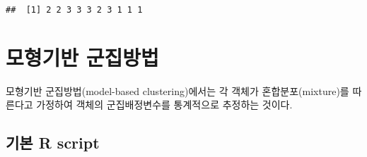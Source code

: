 \documentclass[]{book}
\newenvironment{Shaded}{\begin{snugshade}}{\end{snugshade}}
\newcommand{\DataTypeTok}[1]{\textcolor[rgb]{0.13,0.29,0.53}{#1}}
\newcommand{\DecValTok}[1]{\textcolor[rgb]{0.00,0.00,0.81}{#1}}
\newcommand{\KeywordTok}[1]{\textcolor[rgb]{0.13,0.29,0.53}{\textbf{#1}}}
\newcommand{\NormalTok}[1]{#1}
\newcommand{\OperatorTok}[1]{\textcolor[rgb]{0.81,0.36,0.00}{\textbf{#1}}}
\newcommand{\OtherTok}[1]{\textcolor[rgb]{0.56,0.35,0.01}{#1}}
\newcommand{\StringTok}[1]{\textcolor[rgb]{0.31,0.60,0.02}{#1}}
\begin{document}
\begin{verbatim}
##  [1] 2 2 3 3 3 2 3 1 1 1
\end{verbatim}

\hypertarget{model-based-clustering}{%
\section{모형기반 군집방법}\label{model-based-clustering}}

모형기반 군집방법(model-based clustering)에서는 각 객체가 혼합분포(mixture)를 따른다고 가정하여 객체의 군집배정변수를 통계적으로 추정하는 것이다.

\hypertarget{model-based-clustering-basic-script}{%
\subsection{기본 R script}\label{model-based-clustering-basic-script}}

\begin{Shaded}
\end{Shaded}
\end{document}
